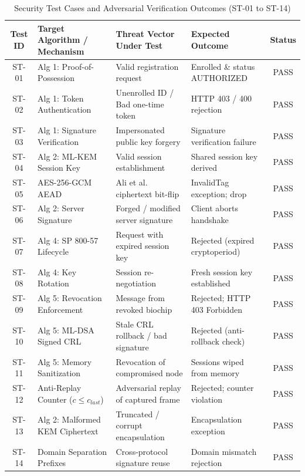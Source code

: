 \begin{table}[htbp]
\centering
\small
\caption{Security Test Cases and Adversarial Verification Outcomes (ST-01 to ST-14)}
\label{tab:security_cases}
\begin{tabular}{clllc}
\hline
\textbf{Test ID} & \textbf{Target Algorithm / Mechanism} & \textbf{Threat Vector Under Test} & \textbf{Expected Outcome} & \textbf{Status} \\
\hline
ST-01 & Alg 1: Proof-of-Possession & Valid registration request & Enrolled \& status AUTHORIZED & PASS \\
ST-02 & Alg 1: Token Authentication & Unenrolled ID / Bad one-time token & HTTP 403 / 400 rejection & PASS \\
ST-03 & Alg 1: Signature Verification & Impersonated public key forgery & Signature verification failure & PASS \\
ST-04 & Alg 2: ML-KEM Session Key & Valid session establishment & Shared session key derived & PASS \\
ST-05 & AES-256-GCM AEAD & Ali et al. ciphertext bit-flip & InvalidTag exception; drop & PASS \\
ST-06 & Alg 2: Server Signature & Forged / modified server signature & Client aborts handshake & PASS \\
ST-07 & Alg 4: SP 800-57 Lifecycle & Request with expired session key & Rejected (expired cryptoperiod) & PASS \\
ST-08 & Alg 4: Key Rotation & Session re-negotiation & Fresh session key established & PASS \\
ST-09 & Alg 5: Revocation Enforcement & Message from revoked biochip & Rejected; HTTP 403 Forbidden & PASS \\
ST-10 & Alg 5: ML-DSA Signed CRL & Stale CRL rollback / bad signature & Rejected (anti-rollback check) & PASS \\
ST-11 & Alg 5: Memory Sanitization & Revocation of compromised node & Sessions wiped from memory & PASS \\
ST-12 & Anti-Replay Counter ($c \le c_{last}$) & Adversarial replay of captured frame & Rejected; counter violation & PASS \\
ST-13 & Alg 2: Malformed KEM Ciphertext & Truncated / corrupt encapsulation & Encapsulation exception & PASS \\
ST-14 & Domain Separation Prefixes & Cross-protocol signature reuse & Domain mismatch rejection & PASS \\
\hline
\end{tabular}
\end{table}

